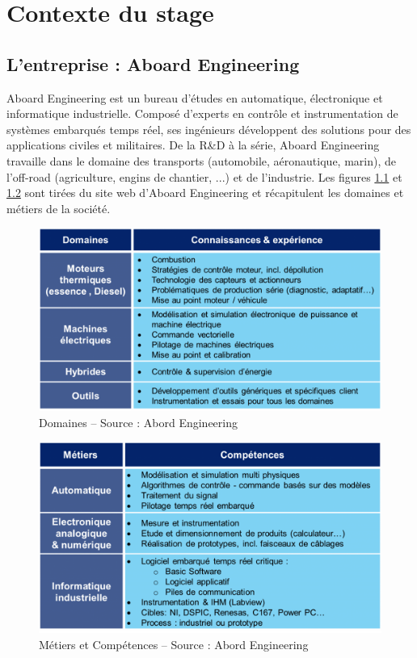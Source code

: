 \chapter{Contexte du stage}
\section{L'entreprise : Aboard Engineering}
Aboard Engineering est un bureau d'études en automatique, électronique et informatique industrielle. Composé d'experts en contrôle et instrumentation de systèmes embarqués temps réel, ses ingénieurs développent des solutions pour des applications civiles et militaires. De la R\&D à la série, Aboard Engineering travaille dans le domaine des transports (automobile, aéronautique, marin), de l'off-road (agriculture, engins de chantier, ...) et de l'industrie. Les figures \ref{fig:domaines} et  \ref{fig:metiers} sont tirées du site web d'Aboard Engineering et récapitulent les domaines et métiers de la société.

\begin{figure}[h]
	\center
	\includegraphics[scale=0.4]{images/domaines}
	\caption{Domaines -- Source : Abord Engineering}
	\label{fig:domaines}
\end{figure}

\begin{figure}[h]
	\center
	\includegraphics[scale=0.4]{images/metiers}
	\caption{Métiers et Compétences -- Source : Abord Engineering}
	\label{fig:metiers}
\end{figure}

